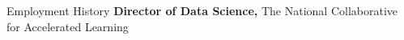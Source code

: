 \begin{rubric}{Employment History}
%
	\textbf{Director of Data Science,} The National Collaborative for Accelerated Learning
%
%
%
\end{rubric}